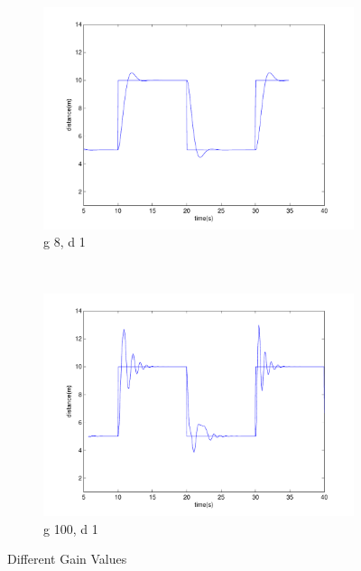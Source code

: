 \begin{figure}
\begin{subfigure}[b]{0.3\textwidth}
                \includegraphics[width=\textwidth]{fig/gain8d1.pdf}
                \caption{g 8, d 1}
                \label{fig:tiger}
        \end{subfigure}
        ~ %
        \begin{subfigure}[b]{0.3\textwidth}
                \includegraphics[width=\textwidth]{fig/gain100d1.pdf}
                \caption{g 100, d 1}
                \label{fig:mouse}
        \end{subfigure}
        \caption{Different Gain Values}\label{fig:animals}
\end{figure}



